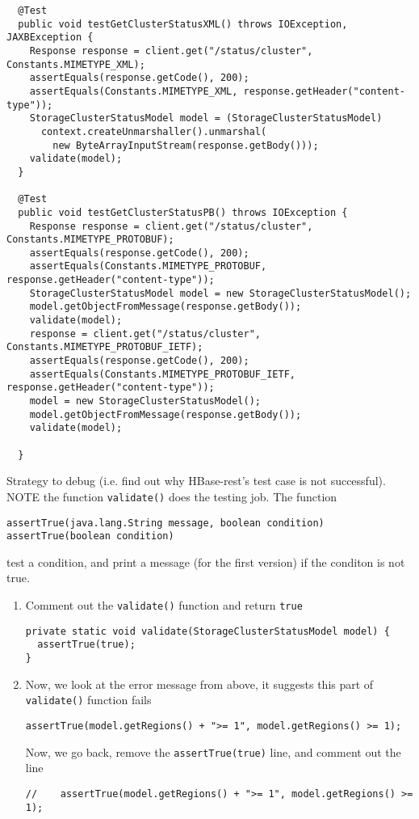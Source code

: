 \begin{verbatim}
  @Test
  public void testGetClusterStatusXML() throws IOException, JAXBException {
    Response response = client.get("/status/cluster", Constants.MIMETYPE_XML);
    assertEquals(response.getCode(), 200);
    assertEquals(Constants.MIMETYPE_XML, response.getHeader("content-type"));
    StorageClusterStatusModel model = (StorageClusterStatusModel)
      context.createUnmarshaller().unmarshal(
        new ByteArrayInputStream(response.getBody()));
    validate(model);
  }

  @Test
  public void testGetClusterStatusPB() throws IOException {
    Response response = client.get("/status/cluster", Constants.MIMETYPE_PROTOBUF);
    assertEquals(response.getCode(), 200);
    assertEquals(Constants.MIMETYPE_PROTOBUF, response.getHeader("content-type"));
    StorageClusterStatusModel model = new StorageClusterStatusModel();
    model.getObjectFromMessage(response.getBody());
    validate(model);
    response = client.get("/status/cluster", Constants.MIMETYPE_PROTOBUF_IETF);
    assertEquals(response.getCode(), 200);
    assertEquals(Constants.MIMETYPE_PROTOBUF_IETF, response.getHeader("content-type"));
    model = new StorageClusterStatusModel();
    model.getObjectFromMessage(response.getBody());
    validate(model);

  }
\end{verbatim}

Strategy to debug (i.e. find out why HBase-rest's test case is not successful).
NOTE the function \verb!validate()! does the testing job. The function
\begin{verbatim}
assertTrue(java.lang.String message, boolean condition)
assertTrue(boolean condition)  
\end{verbatim}
test a condition, and print a message (for the first version) if the conditon is
not true.

\begin{enumerate}
  \item Comment out the \verb!validate()! function and return \verb!true!
\begin{verbatim}
private static void validate(StorageClusterStatusModel model) {
  assertTrue(true);
}  
\end{verbatim}

  \item Now, we look at the error message from above, it suggests this part of
  \verb!validate()! function fails
\begin{verbatim}
assertTrue(model.getRegions() + ">= 1", model.getRegions() >= 1);
\end{verbatim}
 
 Now, we go back, remove the \verb!assertTrue(true)! line, and comment out the
 line
\begin{verbatim}
//    assertTrue(model.getRegions() + ">= 1", model.getRegions() >= 1);
\end{verbatim}


\end{enumerate}

